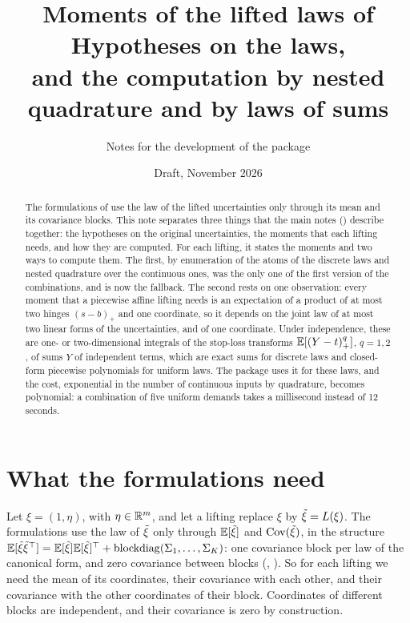 \documentclass[11pt,a4paper]{article}
\title{Moments of the lifted laws of \pkg{}\\[0.5ex]
\large Hypotheses on the laws,\\
and the computation by nested quadrature and by laws of sums}
\author{Notes for the development of the package}
\date{Draft, November 2026}
\numberwithin{equation}{section}
\newcommand{\pos}[1]{(#1)_+}            %
\begin{document}
\maketitle

\begin{abstract}
The formulations of \pkg{} use the law of the lifted uncertainties only through its mean and its covariance blocks.
This note separates three things that the main notes () describe together:
the hypotheses on the original uncertainties,
the moments that each lifting needs,
and how they are computed.
For each lifting, it states the moments and two ways to compute them.
The first, by enumeration of the atoms of the discrete laws and nested quadrature over the continuous ones, was the only one of the first version of the combinations, and is now the fallback.
The second rests on one observation:
every moment that a piecewise affine lifting needs is an expectation of a product of at most two hinges $\pos{s - b}$ and one coordinate,
so it depends on the joint law of at most two linear forms of the uncertainties, and of one coordinate.
Under independence, these are one- or two-dimensional integrals of the stop-loss transforms $\E[\pos{Y - t}^q]$, $q = 1, 2$, of sums $Y$ of independent terms,
which are exact sums for discrete laws and closed-form piecewise polynomials for uniform laws.
The package uses it for these laws, and the cost, exponential in the number of continuous inputs by quadrature, becomes polynomial:
a combination of five uniform demands takes a millisecond instead of 12 seconds.
\end{abstract}

\tableofcontents

\section{What the formulations need}
\label{sec:need}

Let $\xi = (1, \eta)$, with $\eta \in \mathbb{R}^m$, and let a lifting \citep[Section~3]{GWK2015} replace $\xi$ by $\tilde\xi = L(\xi)$.
The formulations use the law of $\tilde\xi$ only through $\mathbb{E}[\tilde\xi]$ and $\operatorname{Cov}(\tilde\xi)$,
in the structure $\mathbb{E}[\tilde\xi\tilde\xi^\top] = \mathbb{E}[\tilde\xi]\mathbb{E}[\tilde\xi]^\top + \operatorname{blockdiag}(\Sigma_{1}, \dots, \Sigma_{K})$:
one covariance block per law of the canonical form, and zero covariance between blocks (, ).
So for each lifting we need the mean of its coordinates,
their covariance with each other,
and their covariance with the other coordinates of their block.
Coordinates of different blocks are independent, and their covariance is zero by construction.
\end{document}
